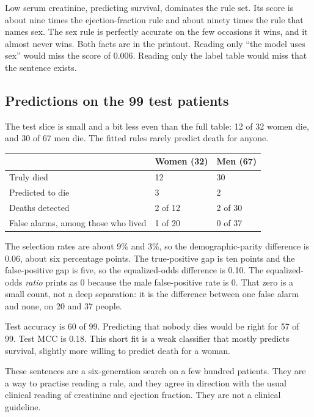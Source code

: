 \documentclass[11pt]{article}
\newcommand{\pct}[1]{\mbox{#1\%}}
\begin{document}
Low serum creatinine, predicting survival, dominates the rule set. Its score is about nine times the ejection-fraction rule and about ninety times the rule that names sex. The sex rule is perfectly accurate on the few occasions it wins, and it almost never wins. Both facts are in the printout. Reading only ``the model uses sex'' would miss the score of 0.006. Reading only the label table would miss that the sentence exists.

\subsection{Predictions on the 99 test patients}

The test slice is small and a bit less even than the full table: 12 of 32 women die, and 30 of 67 men die. The fitted rules rarely predict death for anyone.

\begin{table}[H]
\centering
\small
\begin{tabularx}{\textwidth}{@{}l Y Y@{}}
\toprule
 & Women (32) & Men (67) \\
\midrule
Truly died & 12 & 30 \\
Predicted to die & 3 & 2 \\
Deaths detected & 2 of 12 & 2 of 30 \\
False alarms, among those who lived & 1 of 20 & 0 of 37 \\
\bottomrule
\end{tabularx}
\end{table}

The selection rates are about \pct{9} and \pct{3}, so the demographic-parity difference is 0.06, about six percentage points. The true-positive gap is ten points and the false-positive gap is five, so the equalized-odds difference is 0.10. The equalized-odds \emph{ratio} prints as 0 because the male false-positive rate is 0. That zero is a small count, not a deep separation: it is the difference between one false alarm and none, on 20 and 37 people.

Test accuracy is 60 of 99. Predicting that nobody dies would be right for 57 of 99. Test MCC is 0.18. This short fit is a weak classifier that mostly predicts survival, slightly more willing to predict death for a woman.

\begin{careful}
These sentences are a six-generation search on a few hundred patients. They are a way to practise reading a rule, and they agree in direction with the usual clinical reading of creatinine and ejection fraction. They are not a clinical guideline.
\end{careful}
\end{document}
